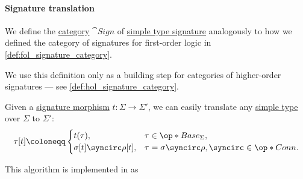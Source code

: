 \paragraph{Signature translation}

\begin{definition}\label{def:simple_type_signature_category}\mimprovised
  We define the \hyperref[def:category]{category} \( \cat{Sign} \) of \hyperref[def:simple_type_signature]{simple type signature} analogously to how we defined the category of signatures for first-order logic in \cref{def:fol_signature_category}.
\end{definition}
\begin{comments}
  \item We use this definition only as a building step for categories of higher-order signatures --- see \cref{def:hol_signature_category}.
\end{comments}

\begin{algorithm}\label{alg:simple_type_signature_translation}
  Given a \hyperref[def:simple_type_signature_category]{signature morphism} \( t: \Sigma \to \Sigma' \), we can easily translate any \hyperref[def:simple_type]{simple type} over \( \Sigma \) to \( \Sigma' \):
  \begin{equation*}
    \tau[t] \coloneqq \begin{cases}
      t(\tau),                    &\tau \in \op*{Base}_\Sigma, \\
      \sigma[t] \syncirc \rho[t], &\tau = \sigma \syncirc \rho, {\syncirc} \in \op*{Conn}.
    \end{cases}
  \end{equation*}
\end{algorithm}
\begin{comments}
  \item This algorithm is implemented in \cite{notebook:code} as
  \begin{CodeRefDisplay}
  \end{CodeRefDisplay}
\end{comments}

